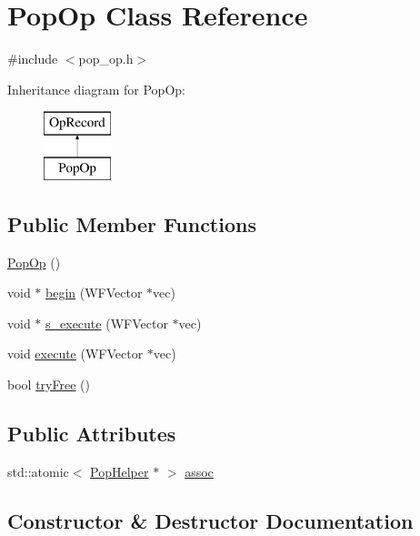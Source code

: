 \hypertarget{class_pop_op}{}\section{Pop\+Op Class Reference}
\label{class_pop_op}


{\ttfamily \#include $<$pop\+\_\+op.\+h$>$}

Inheritance diagram for Pop\+Op\+:\begin{figure}[H]
\begin{center}
\leavevmode
\includegraphics[height=2.000000cm]{class_pop_op}
\end{center}
\end{figure}
\subsection*{Public Member Functions}
\begin{DoxyCompactItemize}
\item 
\hyperlink{class_pop_op_a892b7f55547a7bd14ed03e16da429c4b}{Pop\+Op} ()
\item 
void $\ast$ \hyperlink{class_pop_op_afdea3c00a83ab27ca50a5283ad6f7834}{begin} (W\+F\+Vector $\ast$vec)
\item 
void $\ast$ \hyperlink{class_pop_op_a4fbff3f17df43cc3d3000fe5bdb02ed6}{s\+\_\+execute} (W\+F\+Vector $\ast$vec)
\item 
void \hyperlink{class_pop_op_a5916f1f444527aa67a32e8a38935e21c}{execute} (W\+F\+Vector $\ast$vec)
\item 
bool \hyperlink{class_pop_op_af6ae772dbf74cda9c10ced07939a4e21}{try\+Free} ()
\end{DoxyCompactItemize}
\subsection*{Public Attributes}
\begin{DoxyCompactItemize}
\item 
std\+::atomic$<$ \hyperlink{class_pop_helper}{Pop\+Helper} $\ast$ $>$ \hyperlink{class_pop_op_a54a10dfdaa44c82037f5a50a03aab0a5}{assoc}
\end{DoxyCompactItemize}


\subsection{Constructor \& Destructor Documentation}
\hypertarget{class_pop_op_a892b7f55547a7bd14ed03e16da429c4b}{}
